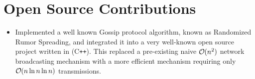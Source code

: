 \documentclass[a4paper,10pt]{article}
\DeclareRobustCommand{\bigO}{%
  \text{\usefont{OMS}{cmsy}{m}{n}O}%
}
\begin{document}
\section{Open Source Contributions}
\vspace{0.25cm}
\begin{itemize}[leftmargin=.27in,label=]
\setlength\itemsep{0.1cm}
\item Implemented a well known Gossip protocol algorithm, known as Randomized Rumor Spreading, and integrated it into a very well-known open source project written in \textsc{(C\texttt{++})}. This replaced a pre-existing naive $\bigO(n^2)$ network broadcasting mechanism with a more efficient mechanism requiring only $\bigO(n\ln n\ln n)$ transmissions.
\end{itemize}
\end{document}
